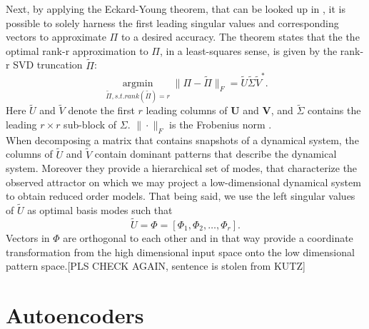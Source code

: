 Next, by applying the Eckard-Young theorem, that can be looked up in \cite{Kutz}, it is possible to solely harness the first leading singular values and corresponding vectors to approximate \(\Pi\) to a desired accuracy. The theorem states that the the optimal rank-r approximation to $\Pi$, in a least-squares sense, is given by the rank-r SVD truncation \(\tilde{\Pi}\):
\begin{equation}
\underset{\tilde{\Pi}, s.t. rank(\tilde{\Pi})=r}{\operatorname{argmin}} \| 
\Pi -\tilde{\Pi}\|_F
=\tilde{U}\tilde{\Sigma}\tilde{V}^*\mathrm{.}
\label{Eq:EckardYoung}
\end{equation} 
Here \(\tilde{U}\) and \(\tilde{V}\) denote the first \(r\) leading columns of \(\mathbf{U}\) and \(\mathbf{V}\), and \(\tilde{\Sigma}\) contains the leading \(r \times r\) sub-block of \(\Sigma\). \(\|\cdot\|_F\) is the Frobenius norm \cite{Kutz}.\\
When decomposing a matrix that contains snapshots of a dynamical system, the columns of \(\tilde{U}\) and \(\tilde{V}\) contain dominant patterns that describe the dynamical system. Moreover they provide a hierarchical set of modes, that characterize the observed attractor on which we may project a low-dimensional dynamical system to obtain reduced order models. That being said, we use the left singular values of \(\tilde{U}\) as optimal basis modes such that
\begin{equation}
	\tilde{U} = \Phi = \left[\Phi_1,\Phi_2,\dots,\Phi_r\right]\mathrm{.}
\end{equation}
Vectors in \(\Phi\) are orthogonal to each other and in that way provide a coordinate transformation from the high dimensional input space onto the low dimensional pattern space.[PLS CHECK AGAIN, sentence is stolen from KUTZ]
\section{Autoencoders}
\label{Sec:AE}

